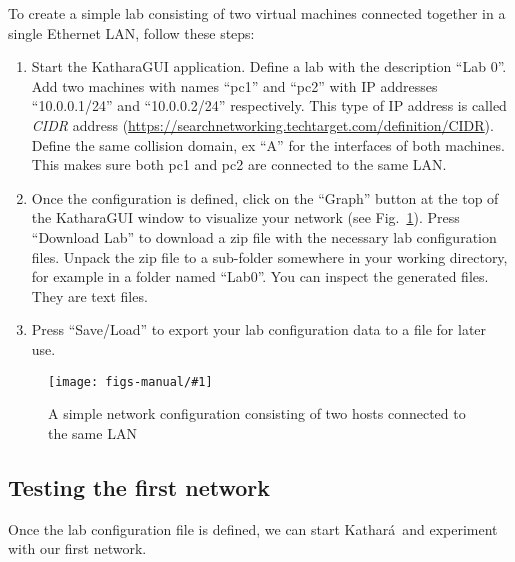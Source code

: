 \documentclass[12pt]{book}
\newcommand{\kathara}{Kathar\'a}
\newcommand{\insfig}[3]{
\begin{figure}[tb]
\begin{center}
\texttt{[image: figs-manual/\#1]}
\caption{#3\label{#1.fig}}
\end{center}
\end{figure}
}
\begin{document}
\smallskip
To create a simple lab consisting of two virtual machines connected together
in a single Ethernet LAN, follow these steps:

\begin{enumerate}[label=(\arabic*)]
\item Start the KatharaGUI application. Define a lab with the
  description ``Lab 0''. Add two machines with names ``pc1'' and
  ``pc2'' with IP addresses ``10.0.0.1/24'' and ``10.0.0.2/24''
  respectively. This type of IP address is called \emph{CIDR} address
  (\url{https://searchnetworking.techtarget.com/definition/CIDR}). 
  Define the same collision domain, ex ``A'' for the interfaces of
  both machines. This makes sure both pc1 and pc2 are connected to the
  same LAN. 

\item Once the configuration is defined, click on the ``Graph'' button
  at the top of the KatharaGUI window to visualize your network (see
  Fig.~\ref*{2nodes.fig}). Press
  ``Download Lab'' to download a zip file with the necessary lab
  configuration files. Unpack the zip file to a sub-folder somewhere
  in your working directory, for example in a folder named
  ``Lab0''. You can inspect the generated files. They are text files.

\item Press ``Save/Load'' to export your lab configuration data to a
  file for later use.
\end{enumerate}

\insfig{2nodes}{.5}{A simple network configuration consisting of two
  hosts connected to the same LAN}


\subsection{Testing the first network}

Once the lab configuration file is defined, we can start \kathara\ and
experiment with our first network.
\end{document}
